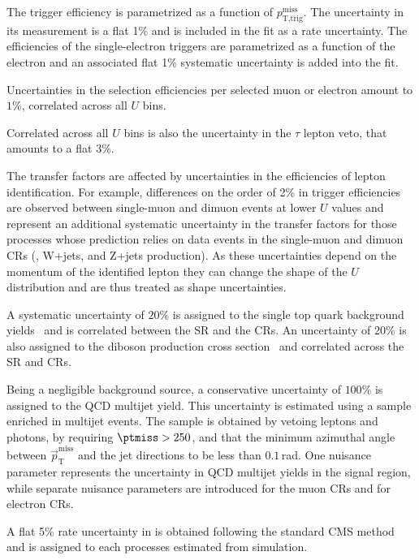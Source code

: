 The \ptmiss trigger efficiency is parametrized as a function of $p_\text{T,trig}^\text{miss}$. The uncertainty in its measurement is a flat 1\% and is included in the fit as a rate uncertainty.
The efficiencies of the single-electron triggers are parametrized as a
function of the electron \pt and an associated flat 1\% systematic uncertainty is added into the fit.

Uncertainties in the selection efficiencies per selected muon or electron amount to $1\%$, correlated across all $U$ bins.

Correlated across all $U$ bins is also the uncertainty in the $\tau$ lepton veto, that amounts to a flat $3\%$.

The transfer factors are affected by uncertainties in the efficiencies
of lepton identification.  For example, differences on the order of
2\% in \MET trigger efficiencies are observed between single-muon and
dimuon events at lower $U$ values and represent an additional
systematic uncertainty in the transfer factors for those processes whose prediction relies on data events in the single-muon and
dimuon CRs (\ttbar, W+jets, and Z+jets production). As these uncertainties depend on the momentum of the identified lepton they can change the shape of the $U$ distribution and are thus treated as shape uncertainties.

A systematic uncertainty of $20\%$ is assigned to the single top quark background yields~\cite{Chatrchyan:1642680} and is correlated between the SR and the CRs. An uncertainty of $20\%$ is also assigned to the diboson production cross section~\cite{Khachatryan:2016txa,Khachatryan:2016tgp} and correlated across the SR and CRs.
%

Being a negligible background source, a conservative uncertainty of $100\%$ is assigned to the QCD multijet yield. This uncertainty is estimated using a sample enriched in multijet events. The sample is obtained by vetoing leptons and photons, by requiring $\ptmiss>250$\GeV, and that the minimum azimuthal angle between $\vec{p}_{\mathrm{T}}^{\mathrm{miss}}$ and the jet directions to be less than $0.1$\,rad. One nuisance parameter represents the uncertainty in QCD multijet yields in the signal region, while separate nuisance parameters are introduced for the muon CRs and for electron CRs.

A flat 5\% rate uncertainty in \ptmiss is obtained following the standard CMS method~\cite{Khachatryan:2014gga} and is assigned to each processes estimated from simulation.

